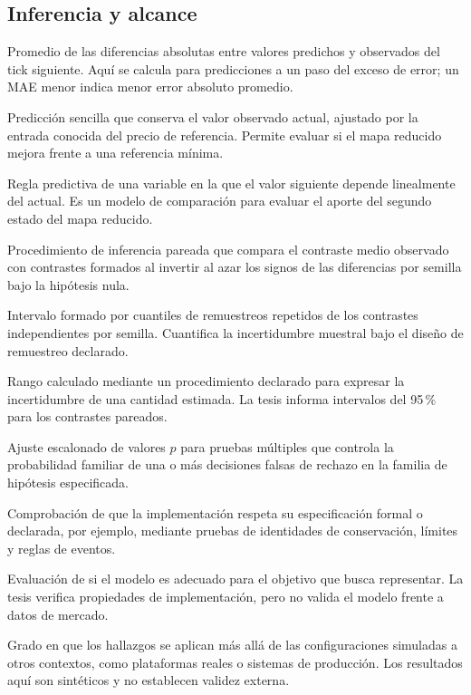 \subsection*{Inferencia y alcance}
\begin{description}[style=unboxed,leftmargin=0pt,labelwidth=0pt,labelsep=0.5em,itemsep=0.1em]
  \item[MAE --- error absoluto medio:] Promedio de las diferencias absolutas entre valores predichos y observados del tick siguiente. Aquí se calcula para predicciones a un paso del exceso de error; un MAE menor indica menor error absoluto promedio.
  \item[Referencia de persistencia:] Predicción sencilla que conserva el valor observado actual, ajustado por la entrada conocida del precio de referencia. Permite evaluar si el mapa reducido mejora frente a una referencia mínima.
  \item[Autorregresión escalar:] Regla predictiva de una variable en la que el valor siguiente depende linealmente del actual. Es un modelo de comparación para evaluar el aporte del segundo estado del mapa reducido.
  \item[Prueba de aleatorización por inversión de signos:] Procedimiento de inferencia pareada que compara el contraste medio observado con contrastes formados al invertir al azar los signos de las diferencias por semilla bajo la hipótesis nula.
  \item[Intervalo de confianza bootstrap percentílico:] Intervalo formado por cuantiles de remuestreos repetidos de los contrastes independientes por semilla. Cuantifica la incertidumbre muestral bajo el diseño de remuestreo declarado.
  \item[Intervalo de confianza:] Rango calculado mediante un procedimiento declarado para expresar la incertidumbre de una cantidad estimada. La tesis informa intervalos del 95\,\% para los contrastes pareados.
  \item[Corrección de Holm:] Ajuste escalonado de valores $p$ para pruebas múltiples que controla la probabilidad familiar de una o más decisiones falsas de rechazo en la familia de hipótesis especificada.
  \item[Verificación:] Comprobación de que la implementación respeta su especificación formal o declarada, por ejemplo, mediante pruebas de identidades de conservación, límites y reglas de eventos.
  \item[Validación:] Evaluación de si el modelo es adecuado para el objetivo que busca representar. La tesis verifica propiedades de implementación, pero no valida el modelo frente a datos de mercado.
  \item[Validez externa:] Grado en que los hallazgos se aplican más allá de las configuraciones simuladas a otros contextos, como plataformas reales o sistemas de producción. Los resultados aquí son sintéticos y no establecen validez externa.
\end{description}
\endgroup
